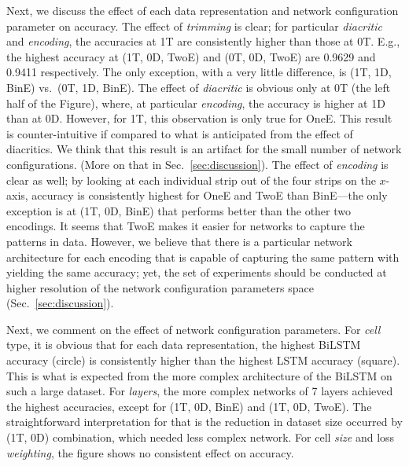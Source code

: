 \documentclass[journal,10pt,twocolumns,letter]{IEEEtran}
\begin{document}
Next, we discuss the effect of each data representation and network configuration parameter on
accuracy. The effect of \textit{trimming} is clear; for particular \textit{diacritic} and
\textit{encoding}, the accuracies at 1T are consistently higher than those at 0T. E.g., the highest
accuracy at (1T, 0D, TwoE) and (0T, 0D, TwoE) are 0.9629 and 0.9411 respectively. The only
exception, with a very little difference, is (1T, 1D, BinE) vs.\ (0T, 1D, BinE). The effect of
\textit{diacritic} is obvious only at 0T (the left half of the Figure), where, at particular
\textit{encoding}, the accuracy is higher at 1D than at 0D. However, for 1T, this observation is
only true for OneE. This result is counter-intuitive if compared to what is anticipated from the
effect of diacritics. We think that this result is an artifact for the small number of network
configurations. (More on that in Sec.~\ref{sec:discussion}). The effect of \textit{encoding} is
clear as well; by looking at each individual strip out of the four strips on the $x$-axis, accuracy
is consistently highest for OneE and TwoE than BinE---the only exception is at (1T, 0D, BinE) that
performs better than the other two encodings. It seems that TwoE makes it easier for networks to
capture the patterns in data. However, we believe that there is a particular network architecture
for each encoding that is capable of capturing the same pattern with yielding the same accuracy; yet,
the set of experiments should be conducted at higher resolution of the network configuration
parameters space (Sec.~\ref{sec:discussion}).

Next, we comment on the effect of network configuration parameters. For \textit{cell} type, it is
obvious that for each data representation, the highest BiLSTM accuracy (circle) is consistently higher
than the highest LSTM accuracy (square). This is what is expected from the more complex architecture of
the BiLSTM on such a large dataset. For \textit{layers}, the more complex networks of 7 layers
achieved the highest accuracies, except for (1T, 0D, BinE) and (1T, 0D, TwoE). The straightforward
interpretation for that is the reduction in dataset size occurred by (1T, 0D) combination, which
needed less complex network. For cell \textit{size} and loss \textit{weighting}, the figure shows no
consistent effect on accuracy.

\bigskip
\end{document}
